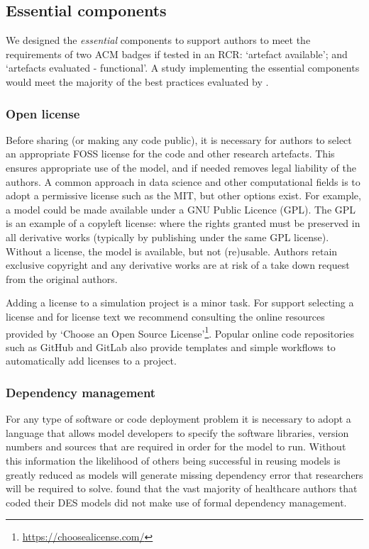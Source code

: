 \documentclass[]{interact}
\theoremstyle{plain}%
\theoremstyle{definition}
\theoremstyle{remark}
\begin{document}
\subsection{Essential components}

 We designed the \textit{essential} components to support authors to meet the requirements of two ACM badges if tested in an RCR: `artefact available'; and `artefacts evaluated - functional'. A study implementing the essential components would meet the majority of the best practices evaluated by \cite{monks2023computer}.

\subsubsection{Open license}
Before sharing (or making any code public), it is necessary for authors to select an appropriate FOSS license for the code and other research artefacts.  This ensures appropriate use of the model, and if needed removes legal liability of the authors. A common approach in data science and other computational fields is to adopt a permissive license such as the MIT, but other options exist.  For example, a model could be made available under a GNU Public Licence (GPL). The GPL is an example of a copyleft license: where the rights granted must be preserved in all derivative works (typically by publishing under the same GPL license).  Without a license, the model is available, but not (re)usable.  Authors retain exclusive copyright and any derivative works are at risk of a take down request from the original authors.

Adding a license to a simulation project is a minor task. For support selecting a license and for license text we recommend consulting the online resources provided by `Choose an Open Source License'\footnote{\url{https://choosealicense.com/}}. Popular online code repositories such as GitHub and GitLab also provide templates and simple workflows to automatically add licenses to a project.


\subsubsection{Dependency management}
For any type of software or code deployment problem it is necessary to adopt a language that allows model developers to specify the software libraries, version numbers and sources that are required in order for the model to run. Without this information the likelihood of others being successful in reusing models is greatly reduced as models will generate missing dependency error that researchers will be required to solve.  \cite{monks2023computer} found that the vast majority of healthcare authors that coded their DES models did not make use of formal dependency management.   
\end{document}
